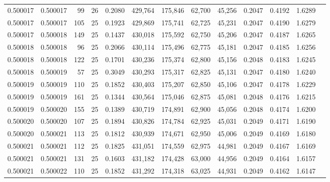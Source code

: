 \begin{tabular}{rrrrrrrrrrrrr}
0.500017 & 0.500017 &  99 &  26 &                                     0.2080 & 429,764 & 175,846 &  62,700 &  45,256 & 0.2047 & 0.4192 & 1.6289 \\
0.500017 & 0.500017 & 105 &  25 &                                     0.1923 & 429,869 & 175,741 &  62,725 &  45,231 & 0.2047 & 0.4190 & 1.6279 \\
0.500017 & 0.500018 & 149 &  25 &                                     0.1437 & 430,018 & 175,592 &  62,750 &  45,206 & 0.2047 & 0.4187 & 1.6265 \\
0.500018 & 0.500018 &  96 &  25 &                                     0.2066 & 430,114 & 175,496 &  62,775 &  45,181 & 0.2047 & 0.4185 & 1.6256 \\
0.500018 & 0.500018 & 122 &  25 &                                     0.1701 & 430,236 & 175,374 &  62,800 &  45,156 & 0.2048 & 0.4183 & 1.6245 \\
0.500018 & 0.500019 &  57 &  25 &                                     0.3049 & 430,293 & 175,317 &  62,825 &  45,131 & 0.2047 & 0.4180 & 1.6240 \\
0.500019 & 0.500019 & 110 &  25 &                                     0.1852 & 430,403 & 175,207 &  62,850 &  45,106 & 0.2047 & 0.4178 & 1.6229 \\
0.500019 & 0.500019 & 161 &  25 &                                     0.1344 & 430,564 & 175,046 &  62,875 &  45,081 & 0.2048 & 0.4176 & 1.6215 \\
0.500019 & 0.500020 & 155 &  25 &                                     0.1389 & 430,719 & 174,891 &  62,900 &  45,056 & 0.2048 & 0.4174 & 1.6200 \\
0.500020 & 0.500020 & 107 &  25 &                                     0.1894 & 430,826 & 174,784 &  62,925 &  45,031 & 0.2049 & 0.4171 & 1.6190 \\
0.500020 & 0.500021 & 113 &  25 &                                     0.1812 & 430,939 & 174,671 &  62,950 &  45,006 & 0.2049 & 0.4169 & 1.6180 \\
0.500021 & 0.500021 & 112 &  25 &                                     0.1825 & 431,051 & 174,559 &  62,975 &  44,981 & 0.2049 & 0.4167 & 1.6169 \\
0.500021 & 0.500021 & 131 &  25 &                                     0.1603 & 431,182 & 174,428 &  63,000 &  44,956 & 0.2049 & 0.4164 & 1.6157 \\
0.500021 & 0.500022 & 110 &  25 &                                     0.1852 & 431,292 & 174,318 &  63,025 &  44,931 & 0.2049 & 0.4162 & 1.6147 \\

\end{tabular}
